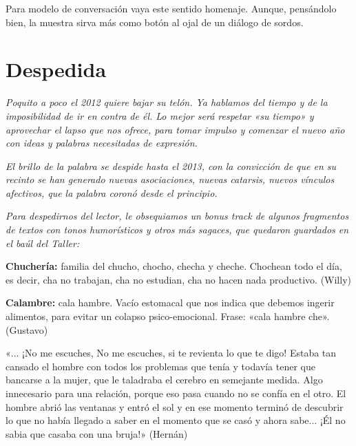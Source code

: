 \documentclass[11pt,twoside,openright,a5paper]{book}
\begin{document}
Para modelo de conversación vaya este sentido homenaje. Aunque, pensándolo bien, la muestra sirva más como botón al ojal de un diálogo de sordos.

\chapter*{Despedida}

\emph{Poquito a poco el 2012 quiere bajar su telón. Ya hablamos del tiempo y de la imposibilidad de ir en contra de él. Lo mejor será respetar «su tiempo» y aprovechar el lapso que nos ofrece, para tomar impulso y comenzar el nuevo año con ideas y palabras necesitadas de expresión.}

\emph{El brillo de la palabra se despide hasta el 2013, con la convicción de que en su recinto se han generado nuevas asociaciones, nuevas catarsis, nuevos vínculos afectivos, que la palabra coronó desde el principio.}

\emph{Para despedirnos del lector, le obsequiamos un bonus track de algunos fragmentos de textos con tonos humorísticos y otros más sagaces, que quedaron guardados en el baúl del Taller:}

\vspace{0.5cm}

\textbf{Chuchería:} familia del chucho, chocho, checha y cheche. Chochean todo el día, es decir, cha no trabajan, cha no estudian, cha no hacen nada productivo. (Willy)

\vspace{0.5cm}

\textbf{Calambre:} cala hambre. Vacío estomacal que nos indica que debemos ingerir alimentos, para evitar un colapso psico-emocional. Frase: «cala hambre che». (Gustavo)

\vspace{0.5cm}

«... ¡No me escuches, No me escuches, si te revienta lo que te digo!
Estaba tan cansado el hombre con todos los problemas que tenía y todavía tener que bancarse a la mujer, que le taladraba el cerebro en semejante medida. Algo innecesario para una relación, porque eso pasa cuando no se confía en el otro. El hombre abrió las ventanas y entró el sol y en ese momento terminó de descubrir lo que no había llegado a saber en el momento que se casó y ahora sabe... ¡Él no sabia que casaba con una bruja!» (Hernán)

\vspace{0.5cm}
\end{document}
